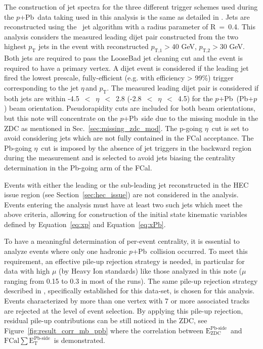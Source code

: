 \documentclass[NOTE, atlasdraft=true, texlive=2020, UKenglish]{atlasdoc}
\newcommand{\EZDC}{$\text{E}_\text{ZDC}^\text{Pb-side}$}
\newcommand{\ETPB}{$\text{FCal} \sum \text{E}_{\text{T}}^{\text{Pb-side} }$}
\newcommand{\PT}{$p_{\text{T}}$}
\newcommand{\ETA}{$\eta$}
\newcommand{\pxPb}{$p$+Pb}
\newcommand{\Pbxp}{Pb+$p$}
\newcommand{\TN}[1]{ \text{#1} }
\begin{document}
The construction of jet spectra for the three different trigger schemes used during the \pxPb\ data taking used in this analysis is the same as detailed in \cite{Longo:2860813}. Jets are reconstructed using the \antikt\ jet algorithm with a radius parameter of R~=~0.4. 
This analysis considers the measured leading dijet pair constructed from the two highest \PT{} jets in the event with reconstructed $p_{\TN{T,1}}>40$ GeV, $p_{\TN{T,2}}>30$ GeV.
Both jets are required to pass the LooseBad jet cleaning cut and the event is required to have a primary vertex. A dijet event is considered if the leading jet fired the lowest prescale, fully-efficient (e.g. with efficiency > 99\%) trigger corresponding to the jet \ETA\,and \PT. 
The measured leading dijet pair is considered if both jets are within -4.5~$<$~\ETA~$<$~2.8 (-2.8~$<$~\ETA~$<$~4.5) for the \pxPb\ (\Pbxp) beam orientation. Pseudorapidity cuts are included for both beam orientations, but this note will concentrate on the \pxPb\ side due to the missing module in the ZDC as mentioned in Sec.~\ref{sec:missing_zdc_mod}. The p-going \ETA\ cut is set to avoid considering jets which are not fully contained in the FCal acceptance. The Pb-going \ETA\ cut is imposed by the absence of jet triggers in the backward region during the measurement and is selected to avoid jets biasing the centrality determination in the Pb-going arm of the FCal. 

Events with either the leading or the sub-leading jet reconstructed in the HEC issue region (see Section~\ref{sec:hec_issue}) are not considered in the analysis. Events entering the analysis must have at least two such jets which meet the above criteria, allowing for construction of the initial state kinematic variables defined by Equation~\ref{eq:xp} and Equation~\ref{eq:xPb}.

To have a meaningful determination of per-event centrality, it is essential to analyze events where only one hadronic \pxPb\ collision occurred. To meet this requirement, an effective pile-up rejection strategy is needed, in particular for data with high $\mu$ (by Heavy Ion standards) like those analyzed in this note ($\mu$ ranging from 0.15 to 0.3 in most of the runs). The same pile-up rejection strategy described in \cite{Hill:2301540}, specifically established for this data-set, is chosen for this analysis. Events characterized by more than one vertex with 7 or more associated tracks are rejected at the level of event selection. By applying this pile-up rejection, residual pile-up contributions can be still noticed in the ZDC, see Figure~\ref{fig:result_corr_mb_ppb} where the correlation between \EZDC\ and \ETPB\ is demonstrated. 
\end{document}
